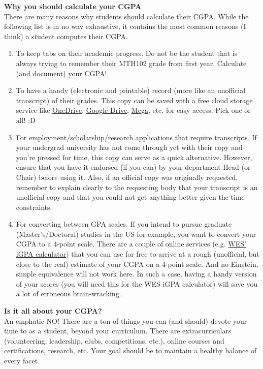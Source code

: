 \documentclass[letter]{article}
\begin{document}
\sffamily
\textbf{Why you should calculate your CGPA}\\
\normalfont
There are many reasons why students should calculate their CGPA. While the following list is in no way exhaustive, it contains the most common reasons (I think) a student computes their CGPA.
\begin{enumerate}
	\item To keep tabs on their academic progress. Do not be the student that is always trying to remember their MTH102 grade from first year. Calculate (and document) your CGPA!
	\item To have a handy (electronic and printable) record (more like an unofficial transcript) of their grades. This copy can be saved with a free cloud storage service like \href{https://onedrive.live.com/about/en-us/signin/}{OneDrive}, \href{https://www.google.com/drive/}{Google Drive}, \href{https://mega.io/}{Mega}, etc. for easy access. Pick one or all! :D
	\item For employment/scholarship/research applications that require transcripts. If your undergrad university has not come through yet with their copy and you're pressed for time, this copy can serve as a quick alternative. However, ensure that you have it endorsed (if you can) by your department Head (or Chair) before using it. Also, if an official copy was originally requested, remember to explain clearly to the requesting body that your transcript is an unofficial copy and that you could not get anything better given the time constraints.
	\item For converting between GPA scales. If you intend to pursue graduate (Master's/Doctoral) studies in the US for example, you want to convert your CGPA to a 4-point scale. There are a couple of online services (e.g. \href{https://applications.wes.org/igpa-calculator/}{WES' iGPA calculator}) that you can use for free to arrive at a rough (unofficial, but close to the real) estimate of your CGPA on a 4-point scale. And no Einstein, simple equivalence will not work here. In such a case, having a handy version of your scores (you will need this for the WES iGPA calculator) will save you a lot of erroneous brain-wracking.

\end{enumerate}

\sffamily
\textbf{Is it all about your CGPA?}\\
\normalfont
An emphatic NO! There are a ton of things you can (and should) devote your time to as a student, beyond your curriculum. There are extracurriculars (volunteering, leadership, clubs, competitions, etc.), online courses and certifications, research, etc. Your goal should be to maintain a healthy balance of every facet.
\end{document}
